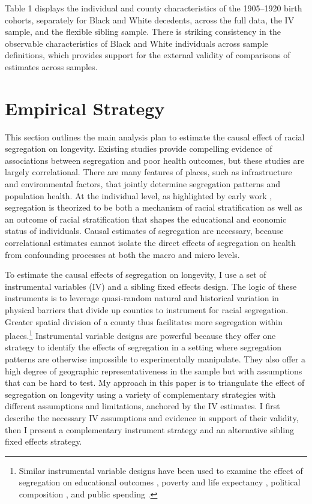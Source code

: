 \documentclass[11pt]{article}
\begin{document}
Table 1 displays the individual and county characteristics of the 1905--1920 birth cohorts, separately for Black and White decedents, across the full data, the IV sample, and the flexible sibling sample. There is striking consistency in the observable characteristics of Black and White individuals across sample definitions, which provides support for the external validity of comparisons of estimates across samples. 




\section{Empirical Strategy}

This section outlines the main analysis plan to estimate the causal effect of racial segregation on longevity. Existing studies provide compelling evidence of associations between segregation and poor health outcomes, but these studies are largely correlational. There are many features of places, such as infrastructure and environmental factors, that jointly determine segregation patterns and population health. At the individual level, as highlighted by early work \citep{massey_effect_1987}, segregation is theorized to be both a mechanism of racial stratification as well as an outcome of racial stratification that shapes the educational and economic status of individuals. Causal estimates of segregation are necessary, because correlational estimates cannot isolate the direct effects of segregation on health from confounding processes at both the macro and micro levels. 

To estimate the causal effects of segregation on longevity, I use a set of instrumental variables (IV) and a sibling fixed effects design. The logic of these instruments is to leverage quasi-random natural and historical variation in physical barriers that divide up counties to instrument for racial segregation. Greater spatial division of a county thus facilitates more segregation within places.\footnote{Similar instrumental variable designs have been used to examine the effect of segregation on educational outcomes \citep{cutler_are_1997,quillian_does_2014}, poverty and life expectancy \citep{ananat_wrong_2011,hendi_where_2024}, political composition \citep{ananat_segregation_2009}, and public spending \citep{trounstine_segregation_2016}.}
Instrumental variable designs are powerful because they offer one strategy to identify the effects of segregation in a setting where segregation patterns are otherwise impossible to experimentally manipulate. They also offer a high degree of geographic representativeness in the sample but with assumptions that can be hard to test. My approach in this paper is to triangulate the effect of segregation on longevity using a variety of complementary strategies with different assumptions and limitations, anchored by the IV estimates. I first describe the necessary IV assumptions and evidence in support of their validity, then I present a complementary instrument strategy and an alternative sibling fixed effects strategy.
\end{document}
